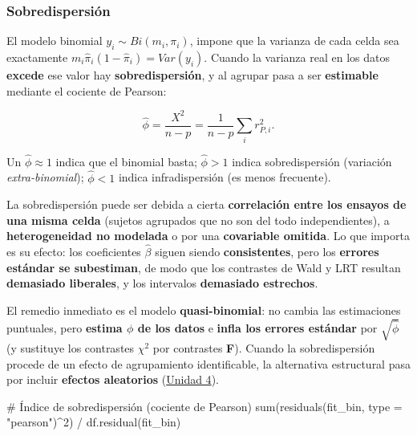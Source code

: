 \documentclass[
  letterpaper,
  DIV=11,
  numbers=noendperiod]{scrartcl}
\newenvironment{Shaded}{\begin{snugshade}}{\end{snugshade}}
\newcommand{\AttributeTok}[1]{\textcolor[rgb]{0.40,0.45,0.13}{#1}}
\newcommand{\CommentTok}[1]{\textcolor[rgb]{0.37,0.37,0.37}{#1}}
\newcommand{\DecValTok}[1]{\textcolor[rgb]{0.68,0.00,0.00}{#1}}
\newcommand{\FunctionTok}[1]{\textcolor[rgb]{0.28,0.35,0.67}{#1}}
\newcommand{\NormalTok}[1]{\textcolor[rgb]{0.00,0.23,0.31}{#1}}
\newcommand{\SpecialCharTok}[1]{\textcolor[rgb]{0.37,0.37,0.37}{#1}}
\newcommand{\StringTok}[1]{\textcolor[rgb]{0.13,0.47,0.30}{#1}}
\begin{document}
\hypertarget{sobredispersiuxf3n}{%
\subsubsection{Sobredispersión}\label{sobredispersiuxf3n}}

El modelo binomial \(y_i \sim Bi(m_i,\pi_i)\), impone que la varianza de
cada celda sea exactamente \(m_i\hat\pi_i(1-\hat\pi_i)=Var(y_i)\).
Cuando la varianza real en los datos \textbf{excede} ese valor hay
\textbf{sobredispersión}, y al agrupar pasa a ser \textbf{estimable}
mediante el cociente de Pearson:

\[
\hat\phi=\frac{X^2}{n-p}=\frac{1}{n-p}\sum_i r_{P,i}^2 .
\]

Un \(\hat\phi\approx 1\) indica que el binomial basta; \(\hat\phi>1\)
indica sobredispersión (variación \emph{extra-binomial}); \(\hat\phi<1\)
indica infradispersión (es menos frecuente).

La sobredispersión puede ser debida a cierta \textbf{correlación entre
los ensayos de una misma celda} (sujetos agrupados que no son del todo
independientes), a \textbf{heterogeneidad no modelada} o por una
\textbf{covariable omitida}. Lo que importa es su efecto: los
coeficientes \(\hat\beta\) siguen siendo \textbf{consistentes}, pero los
\textbf{errores estándar se subestiman}, de modo que los contrastes de
Wald y LRT resultan \textbf{demasiado liberales}, y los intervalos
\textbf{demasiado estrechos}.

El remedio inmediato es el modelo \textbf{quasi-binomial}: no cambia las
estimaciones puntuales, pero \textbf{estima \(\phi\) de los datos} e
\textbf{infla los errores estándar} por \(\sqrt{\hat\phi}\) (y sustituye
los contrastes \(\chi^2\) por contrastes \textbf{F}). Cuando la
sobredispersión procede de un efecto de agrupamiento identificable, la
alternativa estructural pasa por incluir \textbf{efectos aleatorios}
(\protect\hyperlink{sec-u14}{Unidad 4}).

\begin{Shaded}
\begin{Highlighting}[]
\CommentTok{\# Índice de sobredispersión (cociente de Pearson)}
\FunctionTok{sum}\NormalTok{(}\FunctionTok{residuals}\NormalTok{(fit\_bin, }\AttributeTok{type =} \StringTok{"pearson"}\NormalTok{)}\SpecialCharTok{\^{}}\DecValTok{2}\NormalTok{) }\SpecialCharTok{/} \FunctionTok{df.residual}\NormalTok{(fit\_bin)}
\end{Highlighting}
\end{Shaded}
\end{document}
